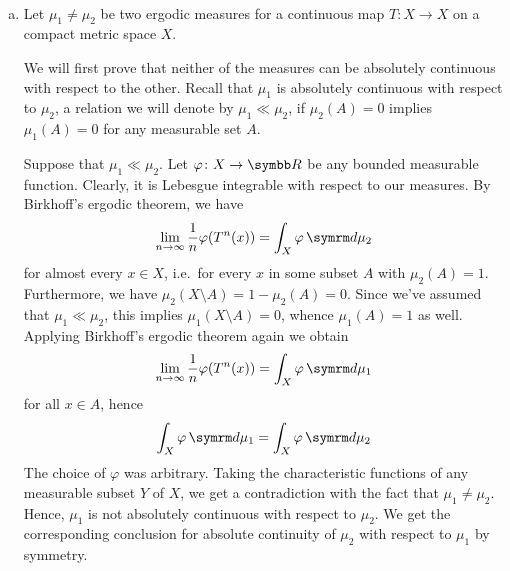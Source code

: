 \begin{problem}
\begin{comment}
We can use this theorem to prove the unique ergodicity of an irrational rotation on the \(n\)-torus by induction. For the base case, take \(X\) to be a point, \(\mu\) to be the Dirac measure centered on this point, \(T\) to be the identity map and \(\varphi (x) = \gamma_1\). For the induction step, write \(\torus^k = \torus^{k - 1} \times \torus\) and define \(\varphi_k (x) = \gamma_k\). We get that
\[
    \hat{T} (x, t) = \left(x_{1 \dots k - 1} + \gamma_{1 \dots k - 1}, t + \gamma_{k}\right)
\]
is uniquely ergodic with respect to \(\lambda^k = \lambda^{k - 1} \otimes \lambda\).
\end{comment}
\end{problem}

\begin{problem}
~
\begin{enumerate}[a)]
    \item Let \(\mu_1 \neq \mu_2\) be two ergodic measures for a continuous map \(T \colon X \to X\) on a compact metric space \(X\).
    
    We will first prove that neither of the measures can be absolutely continuous with respect to the other. Recall that \(\mu_1\) is absolutely continuous with respect to \(\mu_2\), a relation we will denote by \(\mu_1 \ll \mu_2\), if \(\mu_2(A) = 0\) implies \(\mu_1(A) = 0\) for any measurable set \(A\).

    Suppose that \(\mu_1 \ll \mu_2\). Let \(\varphi \colon X \to \reals\) be any bounded measurable function. Clearly, it is Lebesgue integrable with respect to our measures. By Birkhoff's ergodic theorem, we have
    \[
        \lim_{n \to \infty} \frac{1}{n} \varphi(T^n (x)) = \int_{X} \varphi \diff \mu_2
    \]
    for almost every \(x \in X\), i.e.\ for every \(x\) in some subset \(A\) with \(\mu_2 (A) = 1\). Furthermore, we have \(\mu_2 (X \setminus A) = 1 - \mu_2 (A) = 0\). Since we've assumed that \(\mu_1 \ll \mu_2\), this implies \(\mu_1 (X \setminus A) = 0\), whence \(\mu_1 (A) = 1\) as well. Applying Birkhoff's ergodic theorem again we obtain
    \[
        \lim_{n \to \infty} \frac{1}{n} \varphi(T^n (x)) = \int_X \varphi \diff \mu_1
    \]
    for all \(x \in A\), hence
    \[
        \int_{X} \varphi \diff \mu_1 = \int_X \varphi \diff \mu_2
    \]
    The choice of \(\varphi\) was arbitrary. Taking the characteristic functions of any measurable subset \(Y\) of \(X\), we get a contradiction with the fact that \(\mu_1 \neq \mu_2\). Hence, \(\mu_1\) is not absolutely continuous with respect to \(\mu_2\). We get the corresponding conclusion for absolute continuity of \(\mu_2\) with respect to \(\mu_1\) by symmetry.


\end{enumerate}
\end{problem}
